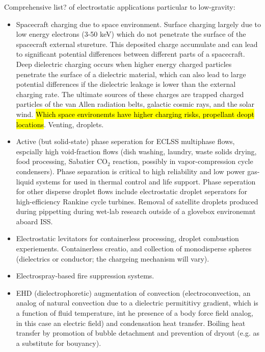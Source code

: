 \documentclass[10pt,a4paper]{article}
\begin{document}
Comprehensive list? of electrostatic applications particular to low-gravity:
\begin{itemize}
\item Spacecraft charging due to space environment. Surface charging largely due to low energy electrons (3-50 keV) which do not penetrate the surface of the spacecraft external stureture. This deposited charge accumulate  and can lead to significant potential differences between different parts of a spacecraft. Deep dielectric charging occurs when higher energy charged particles penetrate the surface of a dielectric material, which can also lead to large potential differences if the dielectric leakage is lower than the external charging rate. The ultimate sources of these charges are trapped charged particles of the van Allen radiation belts, galactic cosmic rays, and the solar wind. \hl{Which space environemts have higher charging risks, propellant deopt locations}. Venting, droplets.

\item Active (but solid-state) phase seperation for ECLSS multiphase flows, espcially high void-fraction flows (dish washing, laundry, waste solids drying, food processing, Sabatier CO$_2$ reaction, possibly in vapor-compression cycle condensers). Phase separation is critical to high reliability and low power gas-liquid systems for used in thermal control and life support. Phase seperation for other disperse droplet flows include electrostatic droplet seperators for high-efficiency Rankine cycle turbines. Removal of satellite droplets produced during pippetting during wet-lab research outside of a glovebox environemnt aboard ISS.

\item Electrostatic levitators for containerless processing, droplet combustion experiements. Containerless creatio, and collection of monodisperse spheres (dielectrics or conductor; the chargeing mechanism will vary).

\item Electrospray-based fire suppression systems.

\item EHD (dielectrophoretic) augmentation of convection (electroconvection, an analog of natural convection due to a dielectric permititivy gradient, which is a function of fluid temperature, int he presence of a body force field analog, in this case an electric field) and condensation heat transfer. Boiling heat transfer by promotion of bubble detachment and prevention of dryout (e.g. as a substitute for bouyancy).


\end{itemize}
\end{document}
